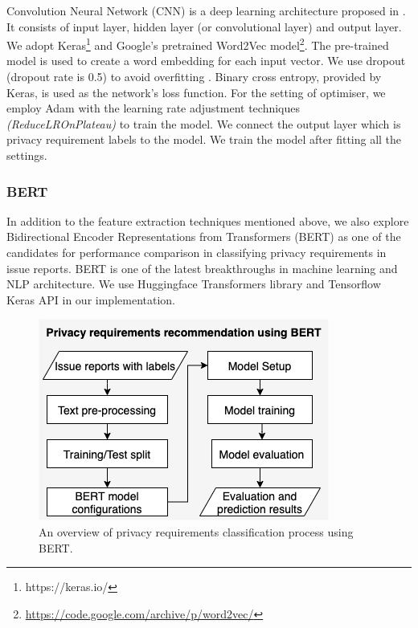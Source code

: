 Convolution Neural Network (CNN) is a deep learning architecture proposed in \cite{LeeMin-JaeHeoChan-GunLee2017}. It consists of input layer, hidden layer (or convolutional layer) and output layer.  We adopt Keras\footnote{https://keras.io/} and Google's pretrained Word2Vec model\footnote{\url{https://code.google.com/archive/p/word2vec/}}. The pre-trained model is used to create a word embedding for each input vector. We use dropout (dropout rate is 0.5) to avoid overfitting \cite{Srivastava2014}. Binary cross entropy, provided by Keras, is used as the network's loss function. For the setting of optimiser, we employ Adam with the learning rate adjustment techniques \textit{(ReduceLROnPlateau)} to train the model. We connect the output layer which is privacy requirement labels to the model. We train the model after fitting all the settings.

\subsubsection{BERT} \label{subsec:BERT}

In addition to the feature extraction techniques mentioned above, we also explore Bidirectional Encoder Representations from Transformers (BERT) as one of the candidates for performance comparison in classifying privacy requirements in issue reports. BERT is one of the latest breakthroughs in machine learning and NLP architecture. We use Huggingface Transformers library \cite{Huggingface2020a} and Tensorflow Keras API \cite{TensorFlow2020} in our implementation.

\begin{figure}[ht]
	\centering
	\includegraphics[width=0.7\linewidth]{"Figures/BERT_process"}
	\caption{An overview of privacy requirements classification process using BERT.}
	\label{fig:BERT_process}
\end{figure}

